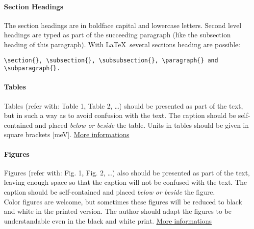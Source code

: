 \documentclass[a4paper, 12pt,oneside]{article}
\makeatletter
\renewcommand{\section}{\@startsection {section}{1}{\z@}%
             {-3.5ex \@plus -1ex \@minus -.2ex}%
             {2.3ex \@plus.2ex}%
             {\normalfont\normalsize\bfseries}}
\renewcommand{\subsection}{\@startsection {subsection}{1}{\z@}%
             {-3.5ex \@plus -1ex \@minus -.2ex}%
             {2.3ex \@plus.2ex}%
             {\normalfont\normalsize\bfseries}}
\makeatother
\begin{document}
\paragraph{Section Headings}%
The section headings are in boldface capital and lowercase letters. %
Second level headings are typed as part of the succeeding paragraph (like the subsection heading of this paragraph). %
With \LaTeX\ several sections heading are possible:%
\begin{verbatim}
\section{}, \subsection{}, \subsubsection{}, \paragraph{} and \subparagraph{}.
\end{verbatim}
%
\paragraph{Tables}%
Tables (refer with: Table 1, Table 2, \ldots) should be presented as part of the text, but in such a way as to avoid confusion with the text. %
The caption should be self-contained and placed \textit{below or beside} the table. %
Units in tables should be given in square brackets [meV]. \href{https://www.sharelatex.com/learn/Tables}{More informations}
%
\paragraph{Figures}%
Figures (refer with: Fig. 1, Fig. 2, \ldots) also should be presented as part of the text, leaving enough space so that the caption will not be confused with the text. %
The caption should be self-contained and placed \textit{below or beside} the figure.\\ %
Color figures are welcome, but sometimes these figures will be reduced to black and white in the printed version. %
The author should adapt the figures to be understandable even in the black and white print. \href{https://www.sharelatex.com/learn/Wrapping_text_around_figures}{More informations}%
%
\end{document}
